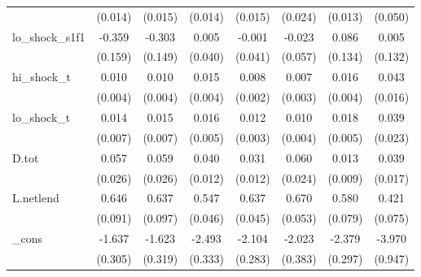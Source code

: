 {\begin{tabular}{l*{7}{c}}
            &     (0.014)         &     (0.015)         &     (0.014)         &     (0.015)         &     (0.024)         &     (0.013)         &     (0.050)         \\
\addlinespace
lo\_shock\_s1f1&      -0.359\sym{**} &      -0.303\sym{*}  &       0.005         &      -0.001         &      -0.023         &       0.086         &       0.005         \\
            &     (0.159)         &     (0.149)         &     (0.040)         &     (0.041)         &     (0.057)         &     (0.134)         &     (0.132)         \\
\addlinespace
hi\_shock\_t  &       0.010\sym{**} &       0.010\sym{**} &       0.015\sym{***}&       0.008\sym{***}&       0.007\sym{**} &       0.016\sym{***}&       0.043\sym{**} \\
            &     (0.004)         &     (0.004)         &     (0.004)         &     (0.002)         &     (0.003)         &     (0.004)         &     (0.016)         \\
\addlinespace
lo\_shock\_t  &       0.014\sym{**} &       0.015\sym{**} &       0.016\sym{***}&       0.012\sym{***}&       0.010\sym{**} &       0.018\sym{***}&       0.039         \\
            &     (0.007)         &     (0.007)         &     (0.005)         &     (0.003)         &     (0.004)         &     (0.005)         &     (0.023)         \\
\addlinespace
D.tot       &       0.057\sym{**} &       0.059\sym{**} &       0.040\sym{***}&       0.031\sym{**} &       0.060\sym{**} &       0.013         &       0.039\sym{**} \\
            &     (0.026)         &     (0.026)         &     (0.012)         &     (0.012)         &     (0.024)         &     (0.009)         &     (0.017)         \\
\addlinespace
L.netlend   &       0.646\sym{***}&       0.637\sym{***}&       0.547\sym{***}&       0.637\sym{***}&       0.670\sym{***}&       0.580\sym{***}&       0.421\sym{***}\\
            &     (0.091)         &     (0.097)         &     (0.046)         &     (0.045)         &     (0.053)         &     (0.079)         &     (0.075)         \\
\addlinespace
\_cons      &      -1.637\sym{***}&      -1.623\sym{***}&      -2.493\sym{***}&      -2.104\sym{***}&      -2.023\sym{***}&      -2.379\sym{***}&      -3.970\sym{***}\\
            &     (0.305)         &     (0.319)         &     (0.333)         &     (0.283)         &     (0.383)         &     (0.297)         &     (0.947)         \\

\end{tabular}}
